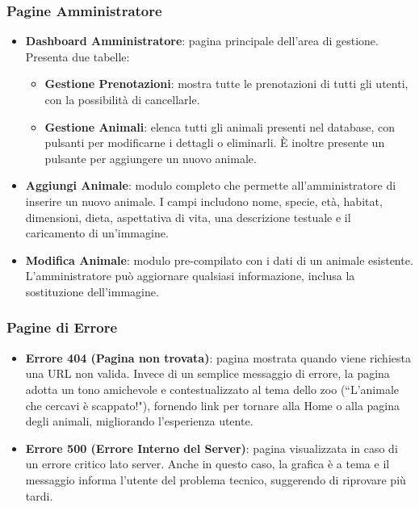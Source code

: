 \subsubsection{Pagine Amministratore}
\begin{itemize}
    \item \textbf{Dashboard Amministratore}: pagina principale dell'area di gestione. Presenta due tabelle:
    \begin{itemize}
        \item \textbf{Gestione Prenotazioni}: mostra tutte le prenotazioni di tutti gli utenti, con la possibilità di cancellarle.
        \item \textbf{Gestione Animali}: elenca tutti gli animali presenti nel database, con pulsanti per modificarne i dettagli o eliminarli. È inoltre presente un pulsante per aggiungere un nuovo animale.
    \end{itemize}

    \item \textbf{Aggiungi Animale}: modulo completo che permette all'amministratore di inserire un nuovo animale. I campi includono nome, specie, età, habitat, dimensioni, dieta, aspettativa di vita, una descrizione testuale e il caricamento di un'immagine.
    
    \item \textbf{Modifica Animale}: modulo pre-compilato con i dati di un animale esistente. L'amministratore può aggiornare qualsiasi informazione, inclusa la sostituzione dell'immagine.
\end{itemize}
\subsubsection{Pagine di Errore}
\begin{itemize}
    \item \textbf{Errore 404 (Pagina non trovata)}: pagina mostrata quando viene richiesta una URL non valida. Invece di un semplice messaggio di errore, la pagina adotta un tono amichevole e contestualizzato al tema dello zoo (``L'animale che cercavi è scappato!"), fornendo link per tornare alla Home o alla pagina degli animali, migliorando l'esperienza utente.
    \item \textbf{Errore 500 (Errore Interno del Server)}: pagina visualizzata in caso di un errore critico lato server. Anche in questo caso, la grafica è a tema e il messaggio informa l'utente del problema tecnico, suggerendo di riprovare più tardi.
\end{itemize}

